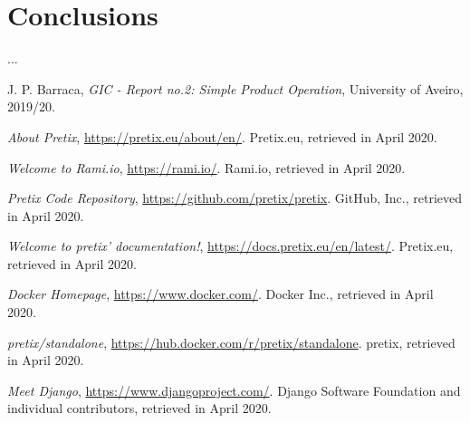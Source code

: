 \documentclass[12pt]{article}
\begin{document}
\newpage
\section*{Conclusions} \label{conclusions} %

...

\newpage
\begin{thebibliography}{9} %
  

    J. P. Barraca,
    \textit{GIC - Report no.2: Simple Product Operation},
    University of Aveiro,
    2019/20.
    \vspace{-10pt}

    \textit{About Pretix},
    \url{https://pretix.eu/about/en/}.
    Pretix.eu,
    retrieved in April 2020.
    \vspace{-10pt}

    \textit{Welcome to Rami.io},
    \url{https://rami.io/}.
    Rami.io,
    retrieved in April 2020.
    \vspace{-10pt}

    \textit{Pretix Code Repository},
    \url{https://github.com/pretix/pretix}.
    GitHub, Inc.,
    retrieved in April 2020.
    \vspace{-10pt}

    \textit{Welcome to pretix' documentation!},
    \url{https://docs.pretix.eu/en/latest/}.
    Pretix.eu,
    retrieved in April 2020.
    \vspace{-10pt}

    \textit{Docker Homepage},
    \url{https://www.docker.com/}.
    Docker Inc.,
    retrieved in April 2020.
    \vspace{-26pt}

    \textit{pretix/standalone},
    \url{https://hub.docker.com/r/pretix/standalone}.
    pretix,
    retrieved in April 2020.
    \vspace{-10pt}

    \textit{Meet Django},
    \url{https://www.djangoproject.com/}.
    Django Software Foundation and individual contributors,
    retrieved in April 2020.
    \vspace{-10pt}


\end{thebibliography}
\end{document}
